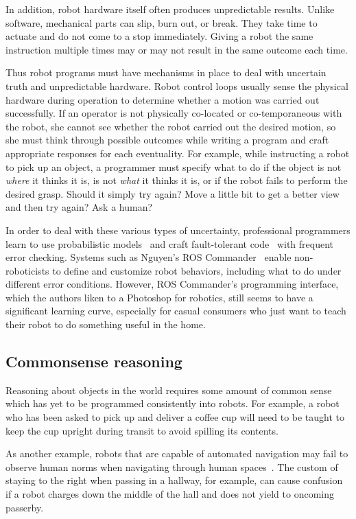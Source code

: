 \documentclass[10pt,twocolumn]{article}
\begin{document}
In addition, robot hardware itself often produces unpredictable results. Unlike software, mechanical parts can slip, burn out, or break. They take time to actuate and do not come to a stop immediately. Giving a robot the same instruction multiple times may or may not result in the same outcome each time.

Thus robot programs must have mechanisms in place to deal with uncertain truth and unpredictable hardware. Robot control loops usually sense the physical hardware during operation to determine whether a motion was carried out successfully.
If an operator is not physically co-located or co-temporaneous with the robot, she cannot see whether the robot carried out the desired motion, so she must think through possible outcomes while writing a program and craft appropriate responses for each eventuality. For example, while instructing a robot to pick up an object, a programmer must specify what to do if the object is not {\em where} it thinks it is, is not {\em what} it thinks it is, or if the robot fails to perform the desired grasp. Should it simply try again? Move a little bit to get a better view and then try again? Ask a human?

In order to deal with these various types of uncertainty, professional programmers learn to use probabilistic models~\cite{darwiche-cacm10} and craft fault-tolerant code~\cite{wright-cacm09} with frequent error checking. Systems such as Nguyen's ROS Commander~\cite{nguyen-icra13} enable non-roboticists to define and customize robot behaviors, including what to do under different error conditions. However, ROS Commander's programming interface, which the authors liken to a Photoshop for robotics, still seems to have a significant learning curve, especially for casual consumers who just want to teach their robot to do something useful in the home.

\subsection{Commonsense reasoning}

Reasoning about objects in the world requires some amount of common sense which has yet to be programmed consistently into robots. For example, a robot who has been asked to pick up and deliver a coffee cup will need to be taught to keep the cup upright during transit to avoid spilling its contents.

As another example, robots that are capable of automated navigation may fail to observe human norms when navigating through human spaces~\cite{lu-iros13}. The custom of staying to the right when passing in a hallway, for example, can cause confusion if a robot charges down the middle of the hall and does not yield to oncoming passerby.
\end{document}
